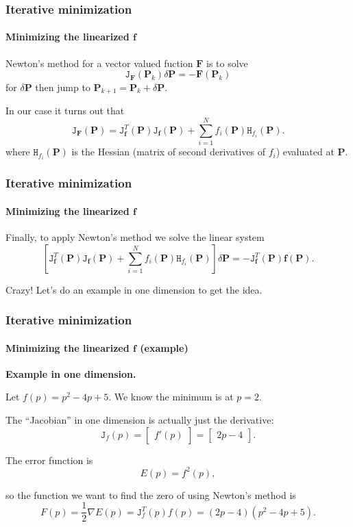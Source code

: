 \documentclass[aspectratio=169]{beamer}
\renewcommand{\vec}[1]{\boldsymbol{#1}}
\newcommand{\mat}[1]{\mathtt{#1}}
\begin{document}
\begin{frame}
\frametitle{Iterative minimization}
\framesubtitle{Minimizing the linearized $\vec{f}$}

Newton's method for a vector valued fuction $\vec{F}$ is to solve
\begin{equation*}
\mat{J}_{\vec{F}}(\vec{P}_k)\delta\vec{P} = -\vec{F}(\vec{P}_k)
\end{equation*}
for $\delta\vec{P}$ then jump to $\vec{P}_{k+1} = \vec{P}_k +
\delta\vec{P}$.

\medskip

In our case it turns out that
\begin{equation*}
\mat{J}_{\vec{F}}(\vec{P}) =
\mat{J}_{\vec{f}}^T(\vec{P})\mat{J}_{\vec{f}}(\vec{P}) + \sum_{i=1}^N
f_i(\vec{P}) \mat{H}_{f_i}(\vec{P}).
\end{equation*}
where $\mat{H}_{f_i}(\vec{P})$ is the \alert{Hessian} (matrix of
second derivatives of $f_i$) evaluated at $\vec{P}$.

\end{frame}


\begin{frame}
\frametitle{Iterative minimization}
\framesubtitle{Minimizing the linearized $\vec{f}$}

Finally, to apply Newton's method we solve the linear system
\begin{equation*}
\left[
\mat{J}_{\vec{f}}^T(\vec{P})\mat{J}_{\vec{f}}(\vec{P}) + \sum_{i=1}^N
f_i(\vec{P}) \mat{H}_{f_i}(\vec{P}) \right] \delta{\vec{P}} =
-\mat{J}^T_{\vec{f}}(\vec{P})\vec{f}(\vec{P}).
\end{equation*}

\medskip

Crazy!  Let's do an example in one dimension to get the idea.

\end{frame}


\begin{frame}
\frametitle{Iterative minimization}
\framesubtitle{Minimizing the linearized $\vec{f}$ (example)}

\textbf{Example in one dimension.}

\medskip

Let $f(p) = p^2-4p+5$.  We know the minimum is at $p=2$.

\medskip

The ``Jacobian'' in one dimension is actually just the derivative:
$$ \mat{J}_f(p) = \begin{bmatrix} f'(p) \end{bmatrix} =
\begin{bmatrix} 2p-4 \end{bmatrix}. $$

The error function is
$$ E(p) = f^2(p), $$

so the function we want to find the zero of using Newton's method is
$$ F(p) = \frac{1}{2}\nabla E(p) = \mat{J}_f^T(p)f(p) = (2p-4)(p^2-4p+5) .$$

\end{frame}
\end{document}
